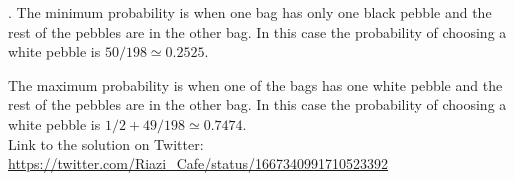 \begin{solution}.
The minimum probability is when one bag has only one black pebble and the rest of the pebbles are in the other bag. In this case the probability of choosing a white pebble is $50/198 \simeq 0.2525$.

The maximum probability is when one of the bags has one white pebble and the rest of the pebbles are in the other bag.  In this case the probability of choosing a white pebble is $1/2 + 49/198 \simeq 0.7474$.\\[0.2cm]

Link to the solution on Twitter:  \url{https://twitter.com/Riazi_Cafe/status/1667340991710523392}\end{solution}